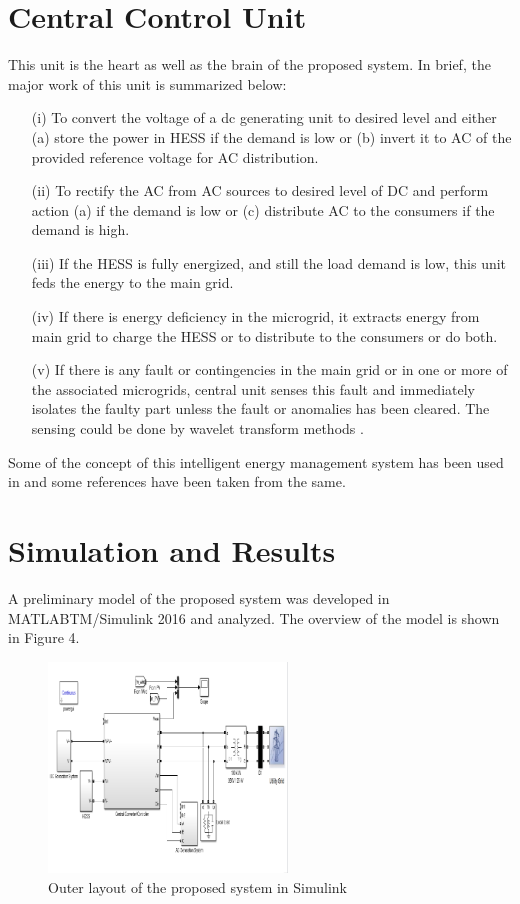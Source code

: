 \documentclass[journal,twoside]{IEEEtran}
\begin{document}
\section{Central Control Unit}
This unit is the heart as well as the brain of
the proposed system. In brief, the major work of this
unit is summarized below:
\begin{itemize}

\item[(i)]
To convert the voltage of a dc generating
unit to desired level and either (a) store
the power in HESS if the demand is low
or (b) invert it to AC of the provided
reference voltage for AC distribution.
\item[(ii)]
To rectify the AC from AC sources to
desired level of DC and perform action (a)
if the demand is low or (c) distribute AC
to the consumers if the demand is high.
\item[(iii)]
If the HESS is fully energized, and still
the load demand is low, this unit feds the
energy to the main grid.
\item[(iv)]
If there is energy deficiency in the
microgrid, it extracts energy from main
grid to charge the HESS or to distribute
to the consumers or do both.
\item[(v)]
If there is any fault or contingencies in
the main grid or in one or more of the
associated microgrids, central unit senses
this fault and immediately isolates the
faulty part unless the fault or anomalies has been cleared. The sensing could be
done by wavelet transform methods \cite{Moghadam2015}.

\end{itemize}


Some of the concept of this intelligent energy
management system has been used in \cite{Vosoloo2050} and some
references have been taken from the same.


\section{Simulation and Results}

A preliminary model of the proposed system
was developed in MATLABTM/Simulink 2016 and
analyzed. The overview of the model is shown in
Figure 4.
\begin{figure}[!ht]
\centering
\includegraphics[width=2.5in]{4}
\caption{Outer layout of the proposed system in
Simulink}
\label{f4}
\end{figure}
\end{document}
